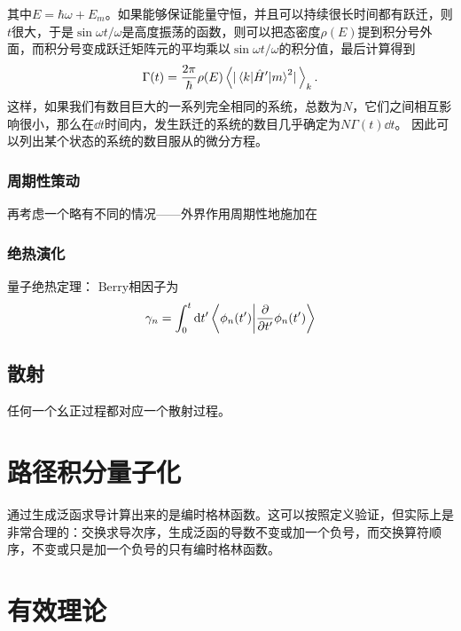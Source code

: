 \documentclass[UTF8, a4paper]{ctexart}
\begin{document}
其中$E = \hbar \omega + E_m$。如果能够保证能量守恒，并且可以持续很长时间都有跃迁，则$t$很大，于是$\sin \omega t / \omega$是高度振荡的函数，则可以把态密度$\rho(E)$提到积分号外面，而积分号变成跃迁矩阵元的平均乘以$\sin \omega t / \omega$的积分值，最后计算得到
\begin{equation}
    \Gamma(t) = \frac{2\pi}{\hbar} \rho(E) \expval{\abs*{\mel{k}{\hat{H}'}{m}^2}}_k.
\end{equation}
这样，如果我们有数目巨大的一系列完全相同的系统，总数为$N$，它们之间相互影响很小，那么在$\dd{t}$时间内，发生跃迁的系统的数目几乎确定为$N \Gamma(t) \dd{t}$。
因此可以列出某个状态的系统的数目服从的微分方程。

\subsubsection{周期性策动}

再考虑一个略有不同的情况——外界作用周期性地施加在


\subsubsection{绝热演化}

量子绝热定理：
Berry相因子为
\begin{equation}
    \gamma_n = \int_0^t \dd{t'} \braket{\phi_n(t')}{\pdv{t'} \phi_n(t')}
\end{equation}

\subsection{散射}


任何一个幺正过程都对应一个散射过程。

\section{路径积分量子化}

通过生成泛函求导计算出来的是编时格林函数。这可以按照定义验证，但实际上是非常合理的：交换求导次序，生成泛函的导数不变或加一个负号，而交换算符顺序，不变或只是加一个负号的只有编时格林函数。


\section{有效理论}
\end{document}
